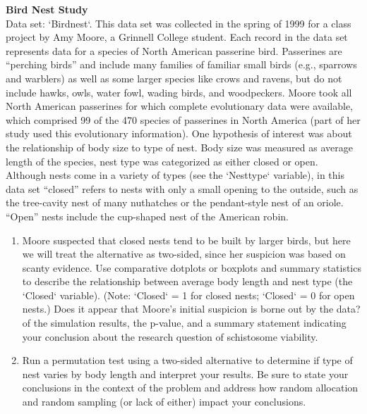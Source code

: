 \documentclass[
]{report}
\theoremstyle{definition}
\theoremstyle{definition}
\theoremstyle{definition}
\theoremstyle{definition}
\theoremstyle{remark}
\begin{document}
\begin{list}{E.}{ \setlength{\itemsep}{0.5em}}
  \item \textbf{Bird Nest Study} \\
  Data set: `Birdnest`. This data set was collected in the spring of 1999 for a class project by Amy Moore, a Grinnell College
student. Each record in the data set represents data for a species of North American passerine
bird. Passerines are “perching birds” and include many families of familiar small birds (e.g., sparrows
and warblers) as well as some larger species like crows and ravens, but do not include hawks,
owls, water fowl, wading birds, and woodpeckers. Moore took all North American passerines for
which complete evolutionary data were available, which comprised 99 of the 470 species of passerines
in North America (part of her study used this evolutionary information). One hypothesis of
interest was about the relationship of body size to type of nest. Body size was measured as average
length of the species, nest type was categorized as either closed or open. Although nests come in
a variety of types (see the `Nesttype` variable), in this data set “closed” refers to nests with only a
small opening to the outside, such as the tree-cavity nest of many nuthatches or the pendant-style
nest of an oriole. “Open” nests include the cup-shaped nest of the American robin.
  \begin{enumerate}
    \setcounter{enumi}{0}  
    \item Moore suspected that closed nests tend to be built by larger birds, but here we will treat the alternative
as two-sided, since her suspicion was based on scanty evidence. Use comparative dotplots
or boxplots and summary statistics to describe the relationship between average body length
and nest type (the `Closed` variable). (Note: `Closed` = 1 for closed nests; `Closed` = 0 for open
nests.) Does it appear that Moore’s initial suspicion is borne out by the data?
of the simulation results, the p-value, and a summary statement indicating your conclusion
about the research question of schistosome viability.
    \item Run a permutation test using a two-sided alternative to determine if type of nest varies by body
length and interpret your results. Be sure to state your conclusions in the context of the problem and
address how random allocation and random sampling (or lack of either) impact your conclusions.
  \end{enumerate}
  

\end{list}
\end{document}
